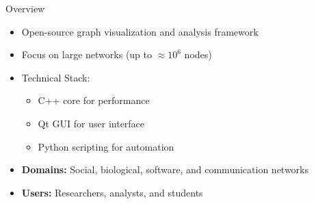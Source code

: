 \begin{frame}{Overview}
	\begin{itemize}
		\item Open-source graph visualization and analysis framework
		\item Focus on large networks (up to $\approx 10^6$ nodes)
		\item Technical Stack:
		\begin{itemize}
			\item C++ core for performance
			\item Qt GUI for user interface
			\item Python scripting for automation
		\end{itemize}
		\item \textbf{Domains:} Social, biological, software, and communication networks
		\item \textbf{Users:} Researchers, analysts, and students
	\end{itemize}
\end{frame}